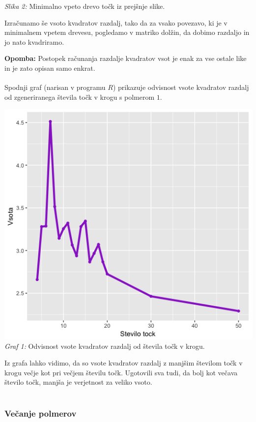 \documentclass[a4paper]{report}
\begin{document}
\begin{enumerate}
\begin{center}
\scriptsize{\textit{Slika 2: } Minimalno vpeto drevo točk iz prejšnje slike.}
\end{center}
Izračunamo še vsoto kvadratov razdalj, tako da za vsako povezavo, ki je v minimalnem vpetem drevesu, pogledamo v matriko dolžin, da dobimo razdaljo in jo nato kvadriramo.
\end{enumerate} 
\textbf{Opomba: } Postopek računanja razdalje kvadratov vsot je enak za vse ostale like in je zato opisan samo enkrat. \\ \\
Spodnji graf (narisan v programu $R$) prikazuje odvisnost vsote kvadratov razdalj od zgeneriranega števila točk v krogu s polmerom $1$.
\begin{center}
\includegraphics[scale = 0.4]{krog_st_tock}\\ 
\scriptsize{\textit{Graf 1: } Odvisnost vsote kvadratov razdalj od števila točk v krogu.}
\end{center}
Iz grafa lahko vidimo, da so vsote kvadratov razdalj z manjšim številom točk v krogu večje kot pri večjem številu točk. Ugotovili sva tudi, da bolj kot večava število točk, manjša je verjetnost za veliko vsoto. \\ \\


\subsubsection{Večanje polmerov}
\end{document}
